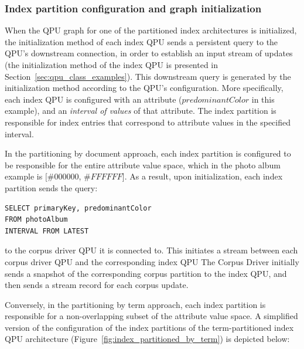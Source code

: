 \subsubsection{Index partition configuration and graph initialization}

When the QPU graph for one of the partitioned index architectures is initialized,
the initialization method of each index QPU sends a persistent query to the QPU's downstream connection,
in order to establish an input stream of updates (the initialization method of the index QPU is presented in Section~\ref{sec:qpu_class_examples}).
This downstream query is generated by the initialization method according to the QPU's configuration.
More specifically, each index QPU is configured with an attribute ($predominantColor$ in this example),
and an \textit{interval of values} of that attribute.
The index partition is responsible for index entries that correspond to attribute values in the specified interval.

In the partitioning by document approach,
each index partition is configured to be responsible for the entire attribute value space,
which in the photo album example is $[\#000000$, $\#FFFFFF$].
As a result, upon initialization, each index partition sends the query:

\begin{lstlisting}[caption={Query sent during initialization from each index partition to the corresponding corpus driver QPU,
  in the QPU graph shown in Figure~\ref{fig:index_partitioned_by_document}.}]
SELECT primaryKey, predominantColor
FROM photoAlbum
INTERVAL FROM LATEST
\end{lstlisting}

\noindent
to the corpus driver QPU it is connected to.
This initiates a stream between each corpus driver QPU and the corresponding index QPU
The Corpus Driver initially sends a snapshot of the corresponding corpus partition to the
index QPU, and then sends a stream record for each corpus update.

Conversely, in the partitioning by term approach, each index partition is responsible for a non-overlapping subset of the
attribute value space.
A simplified version of the configuration of the index partitions of the term-partitioned index QPU architecture
(Figure~\ref{fig:index_partitioned_by_term}) is depicted below: \\

